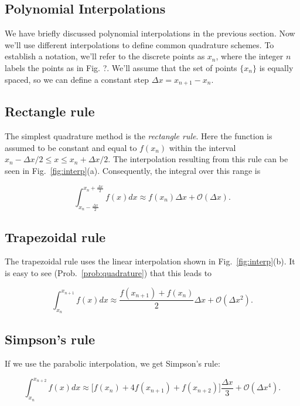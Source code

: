 \subsection{Polynomial Interpolations}

We have briefly discussed polynomial interpolations in the previous section. Now we'll use different interpolations to define common quadrature schemes. To establish a notation, we'll refer to the discrete points as $x_n$, where the integer $n$ labels the points as in Fig. ?. We'll assume that the set of points $\{x_n\}$ is equally spaced, so we can define a constant step $\Delta x = x_{n+1}-x_{n}$.

\subsection*{Rectangle rule}

The simplest quadrature method is the \textit{rectangle rule}. Here the function is assumed to be constant and equal to $f(x_n)$ within the interval $x_n-\Delta x/2 \leq x \leq x_n+\Delta x/2$. The interpolation resulting from this rule can be seen in Fig.~\ref{fig:interp}(a). Consequently, the integral over this range is

\begin{equation}
 \int_{x_n-\frac{\Delta x}{2}}^{x_n+\frac{\Delta x}{2}} f(x) dx \approx f(x_n) \Delta x + \mathcal{O}(\Delta x).
\end{equation}


\subsection*{Trapezoidal rule}

The trapezoidal rule uses the linear interpolation shown in Fig.~\ref{fig:interp}(b). It is easy to see (Prob.~\ref{prob:quadrature}) that this leads to 

\begin{equation}
 \int_{x_n}^{x_{n+1}} f(x) dx \approx \dfrac{f(x_{n+1}) + f(x_n)}{2}\Delta x + \mathcal{O}(\Delta x^2).
\end{equation}

\subsection*{Simpson's rule}

If we use the parabolic interpolation, we get Simpson's rule:

\begin{equation}
 \int_{x_n}^{x_{n+2}} f(x) dx \approx \Big[f(x_n) + 4 f(x_{n+1}) + f(x_{n+2})\Big] \dfrac{\Delta x}{3} + \mathcal{O}(\Delta x^4).
\end{equation}

